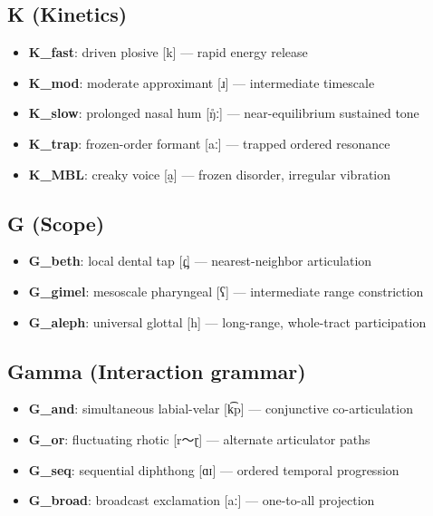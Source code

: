 \documentclass[12pt,a4paper]{article}
\begin{document}
\subsection{K (Kinetics)}

\begin{itemize}
    \item \textbf{K\_fast}: driven plosive {[}k{]} --- rapid energy release
    \item \textbf{K\_mod}: moderate approximant {[}ɹ{]} --- intermediate timescale
    \item \textbf{K\_slow}: prolonged nasal hum {[}ŋ̊ː{]} --- near-equilibrium sustained tone
    \item \textbf{K\_trap}: frozen-order formant {[}aː{]} --- trapped ordered resonance
    \item \textbf{K\_MBL}: creaky voice {[}a̰{]} --- frozen disorder, irregular vibration
\end{itemize}

\subsection{G (Scope)}

\begin{itemize}
    \item \textbf{G\_beth}: local dental tap {[}ɾ̪{]} --- nearest-neighbor articulation
    \item \textbf{G\_gimel}: mesoscale pharyngeal {[}ʕ{]} --- intermediate range constriction
    \item \textbf{G\_aleph}: universal glottal {[}h{]} --- long-range, whole-tract participation
\end{itemize}

\subsection{Gamma (Interaction grammar)}

\begin{itemize}
    \item \textbf{G\_and}: simultaneous labial-velar {[}k͡p{]} --- conjunctive co-articulation
    \item \textbf{G\_or}: fluctuating rhotic {[}r～ɽ{]} --- alternate articulator paths
    \item \textbf{G\_seq}: sequential diphthong {[}ɑɪ{]} --- ordered temporal progression
    \item \textbf{G\_broad}: broadcast exclamation {[}aː{]} --- one-to-all projection
\end{itemize}
\end{document}
